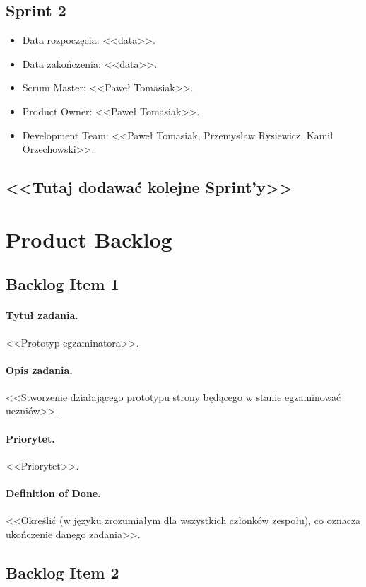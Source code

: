 \documentclass[a4paper]{article}
\begin{document}
\subsection{Sprint 2}

\begin{itemize}
\item Data rozpoczęcia: <<data>>.
\item  Data zakończenia: <<data>>.
\item Scrum Master: <<Paweł Tomasiak>>.
\item Product Owner: <<Paweł Tomasiak>>.
\item Development Team: <<Paweł Tomasiak, Przemysław Rysiewicz, Kamil Orzechowski>>.
\end{itemize}

\subsection*{<<Tutaj dodawać kolejne Sprint'y>>}

\section{Product Backlog}

\subsection{Backlog Item 1}
\paragraph{Tytuł zadania.} <<Prototyp egzaminatora>>.
\paragraph{Opis zadania.} <<Stworzenie działającego prototypu strony będącego w stanie egzaminować uczniów>>.
\paragraph{Priorytet.} <<Priorytet>>.
\paragraph{Definition of Done.} <<Określić (w języku zrozumiałym dla wszystkich członków zespołu), co oznacza ukończenie danego zadania>>.

\subsection{Backlog Item 2}
\end{document}
